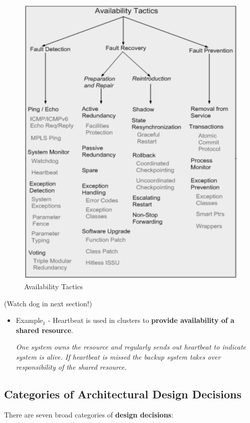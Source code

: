 \documentclass[a4paper]{article}
\begin{document}
\begin{figure}[H]
\centering 
\includegraphics[scale=0.3]{aimages/availaibilitytactic.png}
\caption{\label{tab:widgets}Availability Tactics}
\end{figure}

(Watch dog in next section!)
\begin{itemize}
\item Example$_1$ - Heartbeat is used in clusters to \textbf{provide availability of a shared resource}. 

\textit{One system owns the resource and regularly sends out heartbeat to indicate system is alive. If heartbeat is missed the backup system takes over responsibility of the shared resource.}
\end{itemize}

\subsection{Categories of Architectural Design Decisions}
There are seven broad categories of \textbf{design decisions}:
\end{document}
